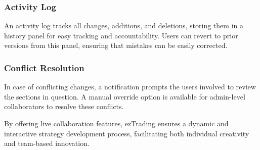 \subsubsection{Activity Log}
\label{subsubsec:activity-log}

An activity log tracks all changes, additions, and deletions, storing them in a history panel for easy tracking and accountability. Users can revert to prior versions from this panel, ensuring that mistakes can be easily corrected.

\subsubsection{Conflict Resolution}
\label{subsubsec:conflict-resolution}

In case of conflicting changes, a notification prompts the users involved to review the sections in question. A manual override option is available for admin-level collaborators to resolve these conflicts.

By offering live collaboration features, ezTrading ensures a dynamic and interactive strategy development process, facilitating both individual creativity and team-based innovation.
